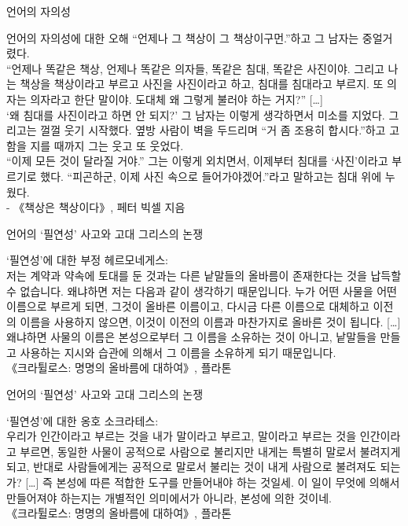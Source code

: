 \documentclass[11pt, aspectratio=169]{beamer}
\begin{document}
\begin{frame}[t]{언어의 자의성}
  \begin{block}{언어의 자의성에 대한 오해}
    “언제나 그 책상이 그 책상이구먼.”하고 그 남자는 중얼거렸다.\\
    “언제나 똑같은 책상, 언제나 똑같은 의자들, 똑같은 침대, 똑같은 사진이야. 그리고 나는 책상을 책상이라고 부르고 사진을 사진이라고 하고, 침대를 침대라고 부르지. 또 의자는 의자라고 한단 말이야. 도대체 왜 그렇게 불러야 하는 거지?” […]\\
    ‘왜 침대를 사진이라고 하면 안 되지?’ 그 남자는 이렇게 생각하면서 미소를 지었다. 그리고는 껄껄 웃기 시작했다. 옆방 사람이 벽을 두드리며 “거 좀 조용히 합시다.”하고 고함을 지를 때까지 그는 웃고 또 웃었다.\\
    “이제 모든 것이 달라질 거야.” 그는 이렇게 외치면서, 이제부터 침대를 ‘사진’이라고 부르기로 했다. “피곤하군, 이제 사진 속으로 들어가야겠어.”라고 말하고는 침대 위에 누웠다.\\
    - 《책상은 책상이다》, 페터 빅셀 지음
  \end{block}
\end{frame}

\begin{frame}[t]{언어의 ‘필연성’ 사고와 고대 그리스의 논쟁}
  \begin{block}{‘필연성’에 대한 부정}
     헤르모네게스: \\ 
    저는 계약과 약속에 토대를 둔 것과는 다른 낱말들의 올바름이 존재한다는 것을 납득할 수 없습니다. 왜냐하면 저는 다음과 같이 생각하기 때문입니다. 누가 어떤 사물을 어떤 이름으로 부르게 되면, 그것이 올바른 이름이고, 다시금 다른 이름으로 대체하고 이전의 이름을 사용하지 않으면, 이것이 이전의 이름과 마찬가지로 올바른 것이 됩니다. […] 왜냐하면 사물의 이름은 본성으로부터 그 이름을 소유하는 것이 아니고, 낱말들을 만들고 사용하는 지시와 습관에 의해서 그 이름을 소유하게 되기 때문입니다.\\
    《크라튈로스: 명명의 올바름에 대하여》, 플라톤
  \end{block}
\end{frame}

\begin{frame}[t]{언어의 ‘필연성’ 사고와 고대 그리스의 논쟁}
  \begin{block}{‘필연성’에 대한 옹호}
     소크라테스: \\ 
    우리가 인간이라고 부르는 것을 내가 말이라고 부르고, 말이라고 부르는 것을 인간이라고 부르면, 동일한 사물이 공적으로 사람으로 불리지만 내게는 특별히 말로서 불려지게 되고, 반대로 사람들에게는 공적으로 말로서 불리는 것이 내게 사람으로 불려져도 되는가? […] 즉 본성에 따른 적합한 도구를 만들어내야 하는 것일세. 이 일이 무엇에 의해서 만들어져야 하는지는 개별적인 의미에서가 아니라, 본성에 의한 것이네. \\
    《크라튈로스: 명명의 올바름에 대하여》, 플라톤
  \end{block}
\end{frame}
\end{document}
